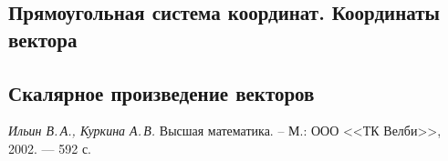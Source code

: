 \documentclass[10pt]{article}
\numberwithin{primer}{section}
\numberwithin{equation}{section}
\begin{document}
\subsection{Прямоугольная система координат. Координаты вектора}
\subsection{Скалярное произведение векторов}

\begin{thebibliography}{99}
 \emph{Ильин В.\,А., Куркина А.\,В.} Высшая
математика. -- М.: ООО <<ТК Велби>>, 2002. --- 592 с.
\end{thebibliography}


\label{lastpage}
\TooltipHidden
\end{document}
